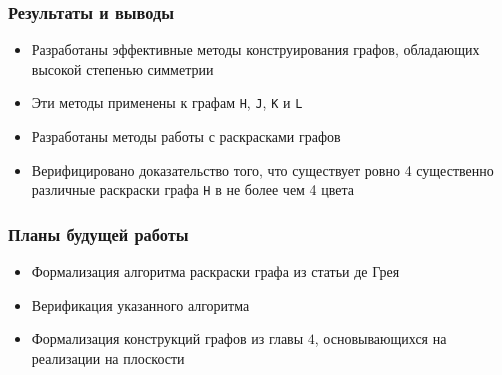 \documentclass[14pt]{beamer}
\begin{document}
\begin{frame}
\frametitle{Результаты и выводы}
\begin{itemize}
    \item Разработаны эффективные методы конструирования графов, обладающих высокой степенью симметрии
    \item Эти методы применены к графам {\tt H}, {\tt J}, {\tt K} и {\tt L}
    \item Разработаны методы работы с раскрасками графов
    \item Верифицировано доказательство того, что существует ровно 4 существенно различные раскраски графа {\tt H} в не более чем 4 цвета
\end{itemize}
\end{frame}

\begin{frame}
\frametitle{Планы будущей работы}
\begin{itemize}
    \item Формализация алгоритма раскраски графа из статьи де Грея
    \item Верификация указанного алгоритма
    \item Формализация конструкций графов из главы $4$, основывающихся на реализации на плоскости 
\end{itemize}
\end{frame}

\begin{frame}
\begin{center}
{\color{purple}{Спасибо за внимание!}}
\end{center}
\end{frame}
\end{document}
